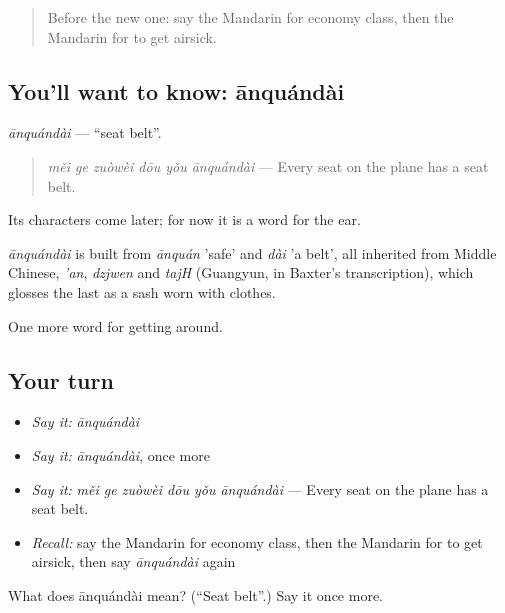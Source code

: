 \label{lesson:ZH-C414-anquandai}



\begin{quote}
Before the new one: say the Mandarin for economy class, then the Mandarin for to get airsick.
\end{quote}

\subsection*{You'll want to know: ānquándài}
\emph{ānquándài} — \textquotedblleft{}seat belt\textquotedblright{}.

\begin{quote}
\emph{měi ge zuòwèi dōu yǒu ānquándài} — Every seat on the plane has a seat belt.
\end{quote}

Its characters come later; for now it is a word for the ear.

\begin{cousinweb}
\emph{ānquándài} is built from \emph{ānquán} 'safe' and \emph{dài} 'a belt', all inherited from Middle Chinese, \emph{'an}, \emph{dzjwen} and \emph{tajH} (Guangyun, in Baxter's transcription), which glosses the last as a sash worn with clothes.
\end{cousinweb}

\begin{grammarlens}[title={What you've built}]
One more word for getting around.
\end{grammarlens}

\subsection*{Your turn}
\begin{itemize}
\raggedright
  \item \emph{Say it:} \emph{ānquándài}
  \item \emph{Say it:} \emph{ānquándài}, once more
  \item \emph{Say it:} \emph{měi ge zuòwèi dōu yǒu ānquándài} — Every seat on the plane has a seat belt.
  \item \emph{Recall:} say the Mandarin for economy class, then the Mandarin for to get airsick, then say \emph{ānquándài} again
\end{itemize}

\begin{tcolorbox}[breakable,colback=teal!4,colframe=teal!35!black,title={Before you move on}]
What does ānquándài mean? (\textquotedblleft{}Seat belt\textquotedblright{}.) Say it once more.
\end{tcolorbox}
